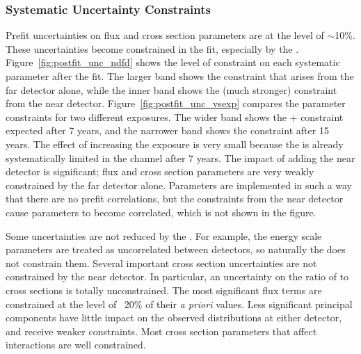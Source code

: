 
\subsubsection{Systematic Uncertainty Constraints}

Prefit uncertainties on flux and cross section parameters are at the level of $\sim$10\%. These uncertainties become constrained in the fit, especially by the . Figure~\ref{fig:postfit_unc_ndfd} shows the level of constraint on each systematic parameter after the fit. The larger band shows the constraint that arises from the far detector alone, while the inner band shows the (much stronger) constraint from the near detector. Figure~\ref{fig:postfit_unc_vsexp} compares the parameter constraints for two different exposures. The wider band shows the + constraint expected after 7 years, and the narrower band shows the constraint after 15 years. The effect of increasing the exposure is very small because the  is already systematically limited in the \numu {} channel after 7 years. The impact of adding the near detector is significant; flux and cross section parameters are very weakly constrained by the far detector alone. Parameters are implemented in such a way that there are no prefit correlations, but the constraints from the near detector cause parameters to become correlated, which is not shown in the figure.

Some uncertainties are not reduced by the . For example, the energy scale parameters are treated as uncorrelated between detectors, so naturally the  does not constrain them. Several important cross section uncertainties are not constrained by the near detector. In particular, an uncertainty on the ratio of \numu to \nue cross sections is totally unconstrained. The most significant flux terms are constrained at the level of ~20\% of their \textit{a priori} values.  Less significant principal components have little impact on the observed distributions at either detector, and receive weaker constraints. Most cross section parameters that affect  interactions are well constrained.

